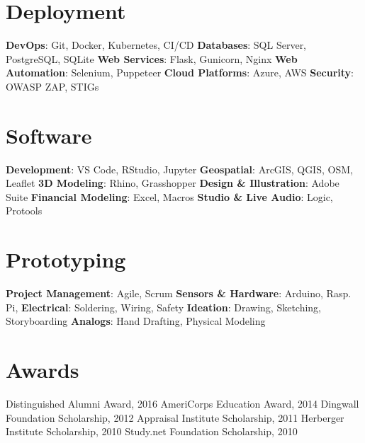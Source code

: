 \documentclass{article}
\begin{document}
\begin{bgbox}[
        height = \paperheight,
        width = 0.3\textwidth,
        colback = gray
    ]
{            \section*{Deployment}
                \textbf{DevOps}: Git, Docker, Kubernetes, CI/CD \newline
                \textbf{Databases}: SQL Server, PostgreSQL, SQLite\newline
                \textbf{Web Services}: Flask, Gunicorn, Nginx\newline
                \textbf{Web Automation}: Selenium, Puppeteer\newline
                \textbf{Cloud Platforms}: Azure, AWS\newline
                \textbf{Security}: OWASP ZAP, STIGs
            \section*{Software}
                \textbf{Development}: VS Code, RStudio, Jupyter\newline
                \textbf{Geospatial}: ArcGIS, QGIS, OSM, Leaflet\newline
                \textbf{3D Modeling}: Rhino, Grasshopper\newline
                \textbf{Design \& Illustration}: Adobe Suite\newline
                \textbf{Financial Modeling}: Excel, Macros\newline
                \textbf{Studio \& Live Audio}: Logic, Protools
            \section*{Prototyping}
                \textbf{Project Management}: Agile, Scrum\newline
                \textbf{Sensors \& Hardware}: Arduino, Rasp. Pi,\newline
                \textbf{Electrical}: Soldering, Wiring, Safety\newline
                \textbf{Ideation}: Drawing, Sketching, Storyboarding\newline
                \textbf{Analogs}: Hand Drafting, Physical Modeling
            \section*{Awards}
                Distinguished Alumni Award, 2016\newline
                AmeriCorps Education Award, 2014\newline
                Dingwall Foundation Scholarship, 2012\newline
                Appraisal Institute Scholarship, 2011\newline
                Herberger Institute Scholarship, 2010\newline
                Study.net Foundation Scholarship, 2010 
        }
    \end{bgbox}
\end{document}
